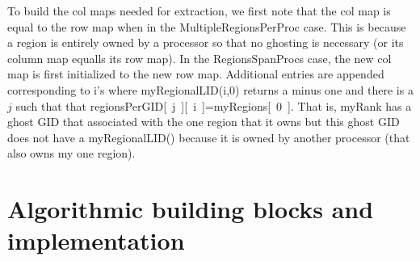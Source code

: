 \documentclass[11pt]{article}
\newcommand{\REMOVE}[1]{}
\begin{document}
\REMOVE{
For some reason,
I wrote a clever version of this for the {\sf RegionsSpanProcs} case.
This code builds a vector corresponding to composite col map with all -1's.

It
additionally adds any GID that is in col map but not in row map
    \begin{enumerate}
    \item  look at remaining -1's and change them to +1 if they
           correspond to a point with multiple regions (that includes my region)
           as this region interface must be included in my new row map.
    \end{enumerate}
    That is, a point is not a region interface if not associated with multiple
    regions. If this point is also a ghost GID, then it must not be interior
    to a region that {\sf myRank} owns. Thus, this GID does not need to be
    included in {\sf myRank}'s new row map. Further, there is a chance that
    some region interface GIDs among {\sf myRank}'s ghost GIDs are not actually
    associated with {\sf myRank}'s regions as
           ghost GIDs might extend into a neighboring region.
\end{quote}
\indent $\bullet$ {\sf MultipleRegionsPerProc}
\begin{quote}
    b) case 2: regions do not cross procs but a proc owns more than one region
         - compute the maximum # of regions that any proc has
         - set numRounds = maxNumRegPerProc
         - for i=1:numRounds
              curRegion = lowestRegOwnedByProc
              rowMap(round) = anyone in my compositeColMap that belongs to curRegion
           end
\end{quote}
}

To build the col maps needed for extraction, we first note that
the col map is equal to the row map when in the {\sf MultipleRegionsPerProc}
case. This is because a region is entirely owned by a processor so that
no ghosting is necessary (or its column map equalls its row map). In the
{\sf RegionsSpanProcs} case, the new col map is first initialized to the
new row map. Additional entries are appended corresponding to
i's where {\sf myRegionalLID(i,0)} returns a minus one and there is a $j$ such that
that {\sf regionsPerGID[~j~][~i~]=myRegions[~0~]}. That is, {\sf myRank}
has a ghost GID that associated with the one region that it owns but
this ghost GID does not have a {\sf myRegionalLID()} because it is owned
by another processor (that also owns my one region).

\section{Algorithmic building blocks and implementation}
\end{document}
